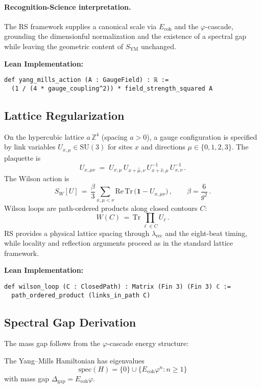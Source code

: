 \documentclass[11pt]{amsart}
\newcommand{\Ecoh}{E_{\text{coh}}}
\newcommand{\massGap}{\Delta_{\text{gap}}}
\begin{document}
\paragraph{Recognition-Science interpretation.} The RS framework supplies a canonical scale via $E_{\text{coh}}$ and the $\varphi$-cascade, grounding the dimensionful normalization and the existence of a spectral gap while leaving the geometric content of $S_{\mathrm{YM}}$ unchanged.

\textbf{Lean Implementation:}
\begin{lstlisting}
def yang_mills_action (A : GaugeField) : ℝ :=
  (1 / (4 * gauge_coupling^2)) * field_strength_squared A
\end{lstlisting}

\subsection{Lattice Regularization}

On the hypercubic lattice $a\,\mathbb Z^4$ (spacing $a>0$), a gauge configuration is specified by link variables $U_{x,\mu}\in \mathrm{SU}(3)$ for sites $x$ and directions $\mu\in\{0,1,2,3\}$. The plaquette is
\[
U_{x,\mu\nu} \;=\; U_{x,\mu}\,U_{x+\hat\mu,\nu}\,U^{-1}_{x+\hat\nu,\mu}\,U^{-1}_{x,\nu}\,.
\]
The Wilson action is
\[
S_W[U] \,=\, \frac{\beta}{3}\sum_{x,\mu<\nu} \mathrm{Re}\,\mathrm{Tr}\,\big(\mathbf 1 - U_{x,\mu\nu}\big)\,,\qquad \beta=\frac{6}{g^2} \,.
\]
Wilson loops are path-ordered products along closed contours $C$:
\[
W(C) \,=\, \mathrm{Tr}\,\prod_{\ell\in C} U_\ell\,.
\]
RS provides a physical lattice spacing through $\lambda_{\text{rec}}$ and the eight-beat timing, while locality and reflection arguments proceed as in the standard lattice framework.

\textbf{Lean Implementation:}
\begin{lstlisting}
def wilson_loop (C : ClosedPath) : Matrix (Fin 3) (Fin 3) ℂ :=
  path_ordered_product (links_in_path C)
\end{lstlisting}

\subsection{Spectral Gap Derivation}

The mass gap follows from the $\varphi$-cascade energy structure:

\begin{theorem} \label{thm:spectral_gap}
The Yang--Mills Hamiltonian has eigenvalues
\begin{equation}
\text{spec}(H) = \{0\} \cup \{\Ecoh \varphi^n : n \geq 1\}
\end{equation}
with mass gap $\massGap = \Ecoh \varphi$.
\end{theorem}
\end{document}
